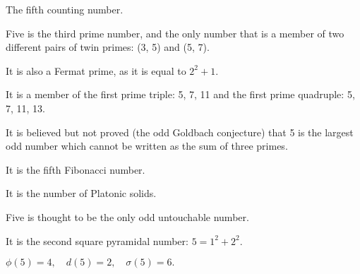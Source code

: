 The fifth counting number.


\par
Five is the third prime number, and the only number that is a member of
two different pairs of twin primes: (3, 5) and (5, 7).
\par
It is also a Fermat prime, as it is equal to $2^{2}+1.$ 
\par
It is a member of the first prime triple: 5, 7, 11 and the 
first prime quadruple: 5, 7, 11, 13.
\par
It is believed but not proved (the odd Goldbach conjecture) that 5 is the
largest odd number which cannot be written as the sum of three primes.
\par
It is the fifth Fibonacci number.
\par
It is the number of Platonic solids.
\par
Five is thought to be the only odd untouchable number.
\par
It is the second square pyramidal number: $5=1^{2}+2^{2}.$ 

\par
$ \phi(5)=4, \quad d(5)=2, \quad \sigma(5)=6 . $
